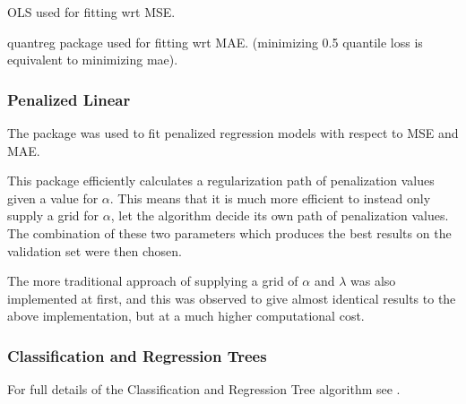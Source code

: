 \documentclass[a4paper, table]{article}
\begin{document}
OLS used for fitting wrt MSE.

quantreg package used for fitting wrt MAE. (minimizing 0.5 quantile loss is equivalent to minimizing mae).

\subsubsection{Penalized Linear}

The package  was used to fit penalized regression models with respect to MSE and MAE.

This package efficiently calculates a regularization path of penalization values given a value for $\alpha$. This means that it is much more efficient to instead only supply a grid for $\alpha$, let the algorithm decide its own path of penalization values. The combination of these two parameters which produces the best results on the validation set were then chosen.

The more traditional approach of supplying a grid of $\alpha$ and $\lambda$ was also implemented at first, and this was observed to give almost identical results to the above implementation, but at a much higher computational cost.

\subsubsection{Classification and Regression Trees}

For full details of the Classification and Regression Tree algorithm see \cite{breiman_classification_1984}. 
\end{document}
